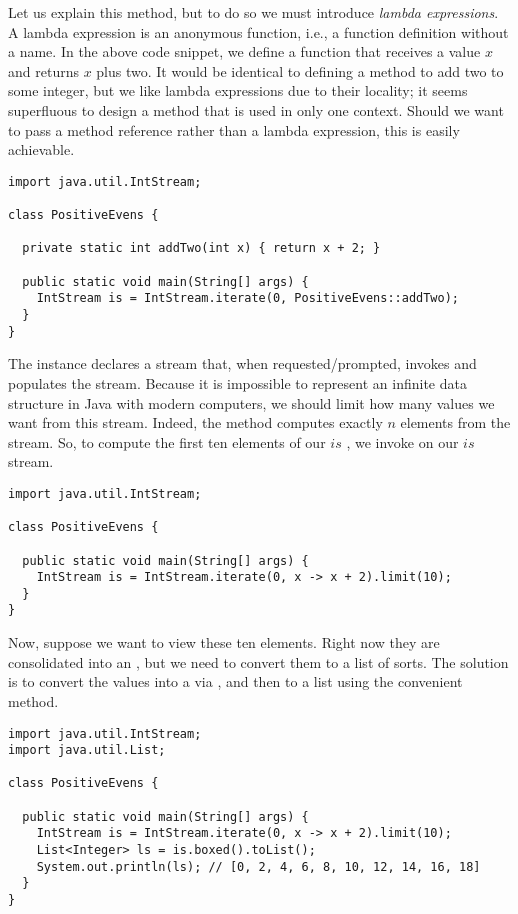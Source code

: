 Let us explain this method, but to do so we must introduce \textit{lambda expressions}. A lambda expression is an anonymous function, i.e., a function definition without a name. In the above code snippet, we define a function that receives a value $x$ and returns $x$ plus two. It would be identical to defining a  method to add two to some integer, but we like lambda expressions due to their locality; it seems superfluous to design a method that is used in only one context. Should we want to pass a method reference rather than a lambda expression, this is easily achievable.
\begin{cl}[]{}
\begin{lstlisting}[language=MyJava]
import java.util.IntStream;

class PositiveEvens {

  private static int addTwo(int x) { return x + 2; }

  public static void main(String[] args) {
    IntStream is = IntStream.iterate(0, PositiveEvens::addTwo);
  }
}   
\end{lstlisting}
\end{cl}

The  instance declares a stream that, when requested/prompted, invokes and populates the stream. Because it is impossible to represent an infinite data structure in Java with modern computers, we should limit how many values we want from this stream. Indeed, the  method computes exactly $n$ elements from the stream. So, to compute the first ten elements of our $\textit{is}$ , we invoke  on our $\textit{is}$ stream. 

\begin{cl}[]{}
\begin{lstlisting}[language=MyJava]
import java.util.IntStream;

class PositiveEvens {
  
  public static void main(String[] args) {
    IntStream is = IntStream.iterate(0, x -> x + 2).limit(10);
  }
}
\end{lstlisting}
\end{cl}
Now, suppose we want to view these ten elements. Right now they are consolidated into an , but we need to convert them to a list of sorts. The solution is to convert the values into a  via , and then to a list using the convenient  method.
\begin{cl}[]{}
\begin{lstlisting}[language=MyJava]
import java.util.IntStream;
import java.util.List;

class PositiveEvens {
  
  public static void main(String[] args) {
    IntStream is = IntStream.iterate(0, x -> x + 2).limit(10);
    List<Integer> ls = is.boxed().toList();
    System.out.println(ls); // [0, 2, 4, 6, 8, 10, 12, 14, 16, 18]
  }
}
\end{lstlisting}
\end{cl}

